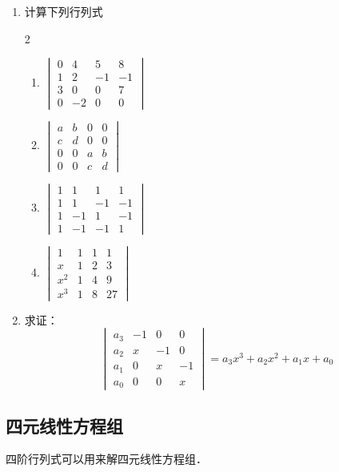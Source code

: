 \begin{ex}
\begin{enumerate}
    \item 计算下列行列式
\begin{multicols}{2}
\begin{enumerate}
    \item $\begin{vmatrix}
      0&4&5&8\\1&2&-1&-1\\
      3&0&0&7\\0&-2&0&0  
    \end{vmatrix}$
    \item $\begin{vmatrix}
        a&b&0&0\\c&d&0&0\\
        0&0&a&b\\0&0&c&d
    \end{vmatrix}$
    \item $\begin{vmatrix}
        1&1&1&1\\1&1&-1&-1\\
        1&-1&1&-1\\1&-1&-1&1
    \end{vmatrix}$
    \item $\begin{vmatrix}
        1&1&1&1\\x&1&2&3\\
        x^2&1&4&9\\x^3&1&8&27
    \end{vmatrix}$
\end{enumerate}
\end{multicols}
    \item 求证：
\[\begin{vmatrix}
    a_3&-1&0&0\\
    a_2&x&-1&0\\
    a_1&0&x&-1\\
    a_0&0&0&x
\end{vmatrix}=a_3x^3+a_2x^2+a_1x+a_0\]
\end{enumerate}    
\end{ex}
    
\subsection{四元线性方程组}
四阶行列式可以用来解四元线性方程组．

